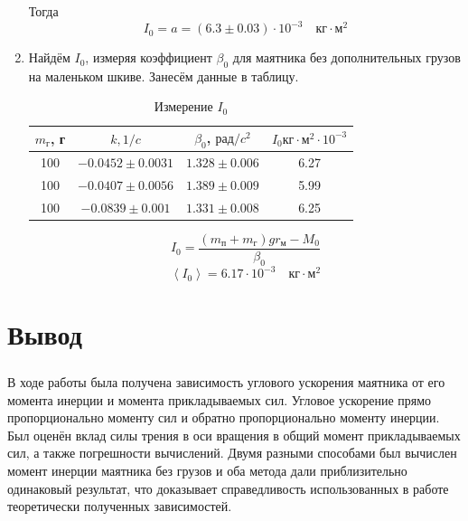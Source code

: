 \documentclass[a4paper,12pt]{article}
\begin{document}
\begin{enumerate}
    Тогда
    \begin{displaymath}
        I_0 = a = (6.3 \pm 0.03) \cdot 10^{-3} \quad кг \cdot м^2
    \end{displaymath}
    \item Найдём $I_0$, измеряя коэффициент $\beta_0$ для маятника без дополнительных грузов на маленьком шкиве. Занесём данные в таблицу.
    \begin{table}[h]
        \centering
        \begin{tabular}{|c|c|c|c|}
            \hline
            $m_г$, г & $k, 1/c$ & $\beta_0$, $рад/c^2$ & $I_0 кг\cdot м^2 \cdot 10^{-3}$  \\
            \hline
            100 & $-0.0 452 \pm 0.0031$ & $ 1.328 \pm 0.006 $ & 6.27 \\
            100 & $-0.0407  \pm 0.0056$ & $ 1.389 \pm 0.009 $ & 5.99 \\
            100 & $-0.0839  \pm 0.001 $ & $ 1.331 \pm 0.008 $ & 6.25 \\ 
            \hline
        \end{tabular}
        \caption{Измерение $I_0$}
    \end{table}
    \begin{displaymath}
        I_0 = \frac{(m_п+m_г)gr_м - M_0}{\beta_0}
    \end{displaymath}
    \begin{displaymath}
        \left\langle I_0 \right\rangle = 6.17 \cdot 10^{-3} \quad кг\cdot м^2 
    \end{displaymath}
\end{enumerate}



\section{Вывод}

\subparagraph*{}В ходе работы была получена зависимость углового ускорения маятника от его момента инерции и момента прикладываемых сил. Угловое ускорение прямо пропорционально моменту сил и обратно пропорционально моменту инерции. Был оценён вклад силы трения в оси вращения в общий момент прикладываемых сил, а также погрешности вычислений. Двумя разными способами был вычислен момент инерции маятника без грузов и оба метода дали приблизительно одинаковый результат, что доказывает справедливость использованных в работе теоретически полученных зависимостей.
\end{document}
